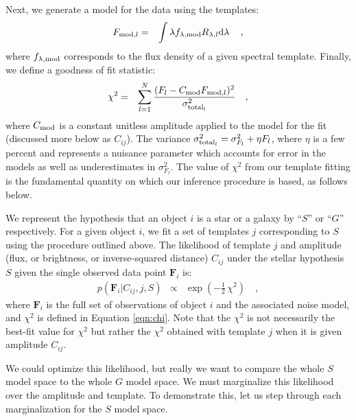 \documentclass[12pt,preprint]{aastex}
\newcommand{\datavector}[1]{\boldsymbol{#1}}
\newcommand{\flux}{\datavector{F}}
\begin{document}
Next, we generate a model for the data using the templates:
\begin{eqnarray}\displaystyle
F_{{\rm mod},l} & = & \int  \lambda f_{\lambda,{\rm mod}} R_{\lambda,l} {\rm d}\lambda\,
\quad ,
\end{eqnarray}
where $f_{\lambda,{\rm mod}}$ corresponds to the flux density 
of a given spectral template.  Finally, we define a goodness of 
fit statistic:
\begin{eqnarray}\displaystyle\label{eqn:chi}
\chi^2 & = & \sum\limits_{l=1}^N \frac{(F_l-C_{\rm mod}F_{{\rm mod},l})^2}{\sigma_{{\rm total}_l}^2}
\quad ,
\end{eqnarray}
where $C_{\rm mod}$ is a constant unitless amplitude applied to the 
model for the fit (discussed more below as $C_{ij}$).  The variance 
$\sigma_{{\rm total}_l}^2 = \sigma_{F_l}^2 + \eta F_{l}$, where $\eta$ is 
a few percent and represents a nuisance parameter which accounts for 
error in the models as well as underestimates in $ \sigma_{F_l}^2 $.  The 
value of $\chi^2$ from our template fitting is the fundamental quantity 
on which our inference procedure is based, as follows below.

We represent the hypothesis that an object $i$ is a star or a galaxy
by ``$S$'' or ``$G$'' respectively.  For a given object $i$, we fit a
set of templates $j$ corresponding to $S$ using the procedure outlined
above.  The likelihood of template $j$ and amplitude (flux, or
brightness, or inverse-squared distance) $C_{ij}$ under the stellar
hypothesis $S$ given the single observed data point $\flux_i$ is:
\begin{eqnarray}\displaystyle
p(\flux_i|C_{ij},j,S) & \propto & \exp(-\frac{1}{2}\,\chi^2)
\quad ,
\end{eqnarray}
where $\flux_i$ is the full set of observations of object $i$ and the
associated noise model, and $\chi^2$ is defined in Equation \ref{eqn:chi}. Note
that the $\chi^2$ is not necessarily the best-fit value for $\chi^2$
but rather the $\chi^2$ obtained with template $j$ when it is given
amplitude $C_{ij}$.

We could optimize this likelihood, but really we want to compare the
whole $S$ model space to the whole $G$ model space.  We must
marginalize this likelihood over the amplitude and template.  To 
demonstrate this, let us step through each marginalization for the 
$S$ model space.
\end{document}
